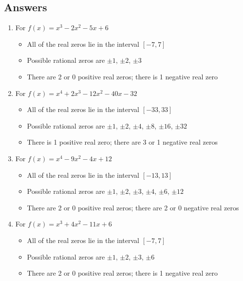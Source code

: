 \newpage

\subsection{Answers}

\begin{enumerate}

\item For $f(x) = x^{3} - 2x^{2} - 5x + 6$
\begin{itemize}
\item  All of the real zeros lie in the interval $[-7,7]$
\item  Possible rational zeros are $\pm 1$, $\pm 2$, $\pm 3$
\item  There are 2 or 0 positive real zeros;  there is 1 negative real zero
\end{itemize}

\item For  $f(x) = x^{4} + 2x^{3} - 12x^{2} - 40x - 32$
\begin{itemize}
\item  All of the real zeros lie in the interval $[-33,33]$
\item  Possible rational zeros are $\pm 1$, $\pm 2$, $\pm 4$, $\pm 8$, $\pm 16$, $\pm 32$
\item  There is 1 positive real zero;  there are 3 or 1 negative real zeros
\end{itemize}

\item For  $f(x) = x^{4} - 9x^{2} - 4x + 12$
\begin{itemize}
\item  All of the real zeros lie in the interval $[-13,13]$
\item  Possible rational zeros are $\pm 1$, $\pm 2$, $\pm 3$, $\pm 4$, $\pm 6$, $\pm 12$
\item  There are 2 or 0 positive real zeros;  there are 2 or 0 negative real zeros
\end{itemize}

\item For  $f(x) = x^{3} + 4x^{2} - 11x + 6$
\begin{itemize}
\item  All of the real zeros lie in the interval $[-7,7]$
\item  Possible rational zeros are $\pm 1$, $\pm 2$, $\pm 3$, $\pm 6$
\item  There are 2 or 0 positive real zeros;  there is 1 negative real zero
\end{itemize}


\end{enumerate}

